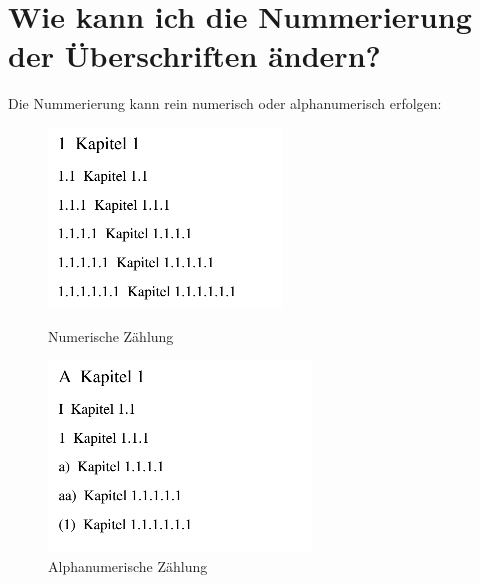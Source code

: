 \documentclass[12pt]{article}
\begin{document}
\section{Wie kann ich die Nummerierung der Überschriften ändern?}
Die Nummerierung kann rein numerisch oder alphanumerisch erfolgen:
\begin{center}
\begin{figure}[!h]
  \centering
  \begin{minipage}[b]{0.4\textwidth}
    \includegraphics[width=\textwidth]{images/numericChapters.png}
    \caption{Numerische Zählung}
  \end{minipage}
  \hfill
  \begin{minipage}[b]{0.4\textwidth}
    \includegraphics[width=\textwidth]{images/alphaNumericChapters.png}
    \caption{Alphanumerische Zählung}
  \end{minipage}
\end{figure}
\end{center}
\end{document}

